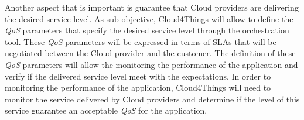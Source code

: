 Another aspect that is important is guarantee that Cloud providers are delivering
the desired service level. As sub objective, Cloud4Things will allow to define the
\textit{QoS} parameters that specify the desired service level through the orchestration
tool. These \textit{QoS} parameters will be expressed in terms of SLAs that will be
negotiated between the Cloud provider and the customer. The definition of these \textit{QoS}
parameters will allow the monitoring the performance of the application and verify if the
delivered service level meet with the expectations. In order to monitoring the performance
of the application, Cloud4Things will need to monitor the service delivered by Cloud
providers and determine if the level of this service guarantee an
acceptable \textit{QoS} for the application.
